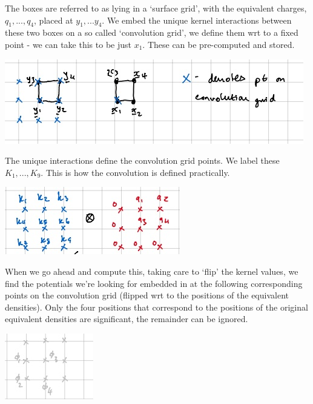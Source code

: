 \documentclass[12pt, a4, twoside]{article}
\begin{document}
The boxes are referred to as lying in a `surface grid', with the equivalent charges, $q_1,...,q_4$,  placed at $y_1,...y_4$. We embed the unique kernel interactions between these two boxes on a so called `convolution grid', we define them wrt to a fixed point - we can take this to be just $x_1$. These can be pre-computed and stored.

\begin{center}    
    \includegraphics{conv_grid.jpg}
\end{center}

The unique interactions define the convolution grid points. We label these $K_1,...,K_9$. This is how the convolution is defined practically.

\begin{center}    
    \includegraphics{conv.jpg}
\end{center}

When we go ahead and compute this, taking care to `flip' the kernel values, we find the potentials we're looking for embedded in at the following corresponding points on the convolution grid (flipped wrt to the positions of the equivalent densities). Only the four positions that correspond to the positions of the original equivalent densities are significant, the remainder can be ignored.


\begin{center}    
    \includegraphics{result.jpg}
\end{center}
\end{document}

